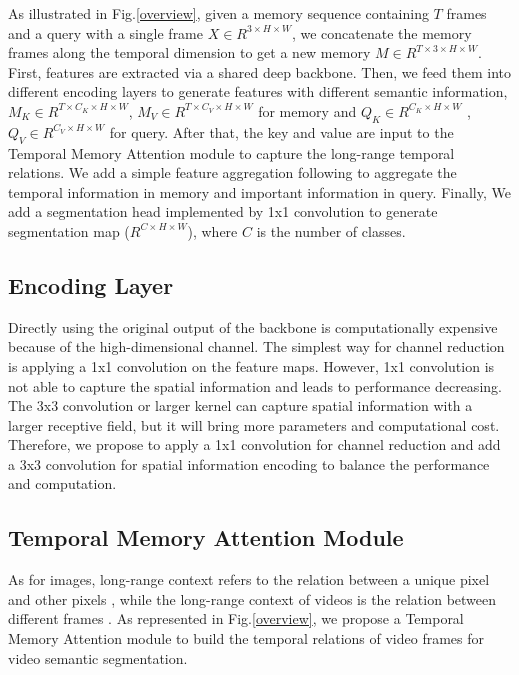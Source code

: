 \documentclass{article}
\begin{document}
	
	As illustrated in Fig.\ref{overview}, given a memory sequence containing $T$ frames and a query with a single frame $X \in R^{3 \times H \times W}$, we concatenate the memory frames along the temporal dimension to get a new memory $M\in R^{T\times3 \times H \times W}$. First, features are extracted via a shared deep backbone. Then, we feed them into different encoding layers to generate features with different semantic information, $M_K\in R^{T \times C_K \times H \times W}$, $M_V \in R^{T \times C_V \times H \times W}$ for memory and $Q_K\in R^{C_K \times H \times W}$ , $Q_V \in R^{C_V \times H \times W}$ for query. After that, the key and value are input to the Temporal Memory Attention module to capture the long-range temporal relations. We add a simple feature aggregation following \cite{DANet2019, STA2019} to aggregate the temporal information in memory and important information in query. Finally, We add a segmentation head implemented by 1x1 convolution to generate segmentation map ($ R^{C \times H \times W}$), where $C$ is the number of classes.
	
	\subsection{Encoding Layer}
Directly using the original output of the backbone is computationally expensive because of the high-dimensional channel.
	The simplest way for channel reduction is applying a 1x1 convolution on the feature maps. However, 1x1 convolution is not able to capture the spatial information and leads to performance decreasing. 
	The 3x3 convolution or larger kernel can capture spatial information with a larger receptive field, but it will bring more parameters and computational cost. 
	Therefore, we propose to apply a 1x1 convolution for channel reduction and add a 3x3 convolution for spatial information encoding to balance the performance and computation.
	
	\subsection{Temporal Memory Attention Module}
	
	As for images, long-range context refers to the relation between a unique pixel and other pixels \cite{DANet2019}, while the long-range context of videos is the relation between different frames \cite{nonlocal2018, STA2019}. As represented in Fig.\ref{overview}, we propose a Temporal Memory Attention module to build the temporal relations of video frames for video semantic segmentation.
	
\end{document}
